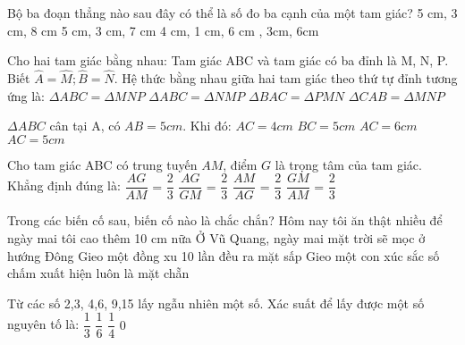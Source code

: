 \begin{ex}[NB-TN7] Bộ ba đoạn thẳng nào sau đây có thể là số đo ba cạnh của một tam giác?
	\choice
	{5 cm, 3 cm, 8 cm}
	{5 cm, 3 cm, 7 cm}
	{4 cm, 1 cm, 6 cm}
	{\True 1cm, 3cm, 6cm}
	\loigiai{}
\end{ex}

\begin{ex}[NB-TN 8]Cho hai tam giác bằng nhau: Tam giác ABC và tam giác có ba đỉnh là M, N, P. Biết $\widehat{A}=\widehat{M};\widehat{B}=\widehat{N}$. Hệ thức bằng nhau giữa hai tam giác theo thứ tự đỉnh tương ứng là:
	\choice
	{\True $\Delta ABC=\Delta MNP$}
	{$\Delta ABC=\Delta NMP$}
	{$\Delta BAC=\Delta PMN$}
	{$\Delta CAB=\Delta MNP$}
	\loigiai{}
\end{ex}

\begin{ex}[NB-TN 9] $\Delta ABC$ cân tại A, có $AB=5cm$. Khi đó:
	\choice
	{$AC = 4cm$}
	{$BC = 5cm$}
	{$AC = 6cm$}
	{\True $AC = 5cm$}
	\loigiai{}
\end{ex}

\begin{ex}[NB-TN 10] Cho tam giác ABC có trung tuyến $AM$, điểm $G$ là trọng tâm của tam giác. Khẳng định đúng là:
	\choice
	{\True $\dfrac{AG}{AM}$ = $\dfrac{2}{3}$}
	{$\dfrac{AG}{GM}$ = $\dfrac{2}{3}$}
	{$\dfrac{AM}{AG}$ = $\dfrac{2}{3}$}
	{$\dfrac{GM}{AM}$ = $\dfrac{2}{3}$}
	\loigiai{}
\end{ex}

\begin{ex}[NB-TN 5] Trong các biến cố sau, biến cố nào là chắc chắn?
	\choice
	{Hôm nay tôi ăn thật nhiều để ngày mai tôi cao thêm 10 cm nữa}
	{\True Ở Vũ Quang, ngày mai mặt trời sẽ mọc ở hướng Đông}
	{Gieo một đồng xu 10 lần đều ra mặt sấp}
	{Gieo một con xúc sắc số chấm xuất hiện luôn là mặt chẵn}
	\loigiai{}
\end{ex}

\begin{ex}[NB-TN 6]Từ các số 2,3, 4,6, 9,15 lấy ngẫu nhiên một số. Xác suất để lấy được một số nguyên tố là:
	\choice
	{\True $\dfrac{1}{3}$}
	{$\dfrac{1}{6}$}
	{$\dfrac{1}{4}$}
	{$0$}
	\loigiai{}
\end{ex}

